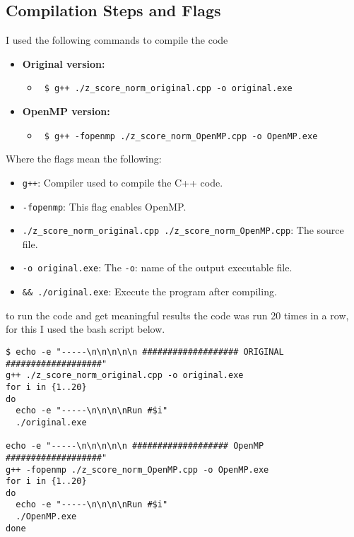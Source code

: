 \documentclass{article}
\begin{document}
\subsection{Compilation Steps and Flags} \label{sec:compilation}
I used the following commands to compile the code
\begin{itemize}
    \item \textbf{Original version:}
    \begin{itemize}
        \item \begin{verbatim} $ g++ ./z_score_norm_original.cpp -o original.exe  \end{verbatim}
    \end{itemize}
    \item \textbf{OpenMP version:}
    \begin{itemize}
        \item \begin{verbatim} $ g++ -fopenmp ./z_score_norm_OpenMP.cpp -o OpenMP.exe \end{verbatim}
    \end{itemize}

\end{itemize}
Where the flags mean the following: 
\begin{itemize}
    \item \texttt{g++}: Compiler used to compile the C++ code.
    \item \texttt{-fopenmp}: This flag enables OpenMP.
    \item \texttt{./z\_score\_norm\_original.cpp ./z\_score\_norm\_OpenMP.cpp}: The source file. 
    \item \texttt{-o original.exe}: The \texttt{-o}: name of the output executable file.
    \item \texttt{\&\& ./original.exe}: Execute the program after compiling.
\end{itemize}

to run the code and get meaningful results the code was run 20 times in a row, for this I used the bash script below.
\begin{scriptsize}
\begin{verbatim}
$ echo -e "-----\n\n\n\n\n ################### ORIGINAL ###################"
g++ ./z_score_norm_original.cpp -o original.exe
for i in {1..20}
do
  echo -e "-----\n\n\n\nRun #$i"
  ./original.exe

echo -e "-----\n\n\n\n\n ################### OpenMP ###################"
g++ -fopenmp ./z_score_norm_OpenMP.cpp -o OpenMP.exe
for i in {1..20}
do
  echo -e "-----\n\n\n\nRun #$i"
  ./OpenMP.exe
done
\end{verbatim}
\end{scriptsize}
\end{document}
